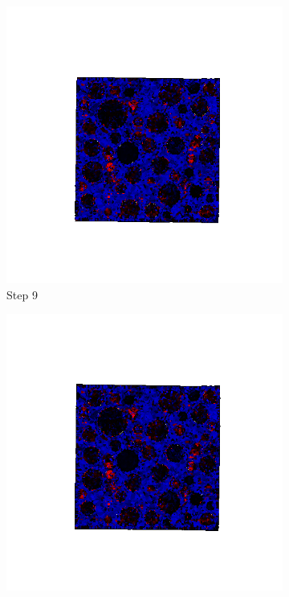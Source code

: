 \begin{figure}[ht!]
      \begin{subfigure}{.25\textwidth}
        \centering
        \includegraphics[width=1.0\linewidth]{Files//A30P75_3_IS/DEP50-STEP(009).png}
      \caption{Step 9}
      \end{subfigure}%
      \begin{subfigure}{.25\textwidth}
        \centering
        \includegraphics[width=1.0\linewidth]{Files/A30P75_3_IS/DEP50-STEP(010).png}

\end{subfigure}
\end{figure}
